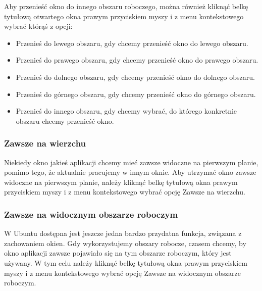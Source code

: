 Aby przenieść okno do innego obszaru roboczego, można również kliknąć belkę tytułową otwartego okna prawym przyciskiem myszy i z menu kontekstowego wybrać którąś z opcji:
\begin{itemize}
\item \textcolor{ubuntu_orange}{Przenieś do lewego obszaru}, gdy chcemy przenieść okno do lewego obszaru.
\item \textcolor{ubuntu_orange}{Przenieś do prawego obszaru}, gdy chcemy przenieść okno do prawego obszaru.
\item \textcolor{ubuntu_orange}{Przenieś do dolnego obszaru}, gdy chcemy przenieść okno do dolnego obszaru.
\item \textcolor{ubuntu_orange}{Przenieś do górnego obszaru}, gdy chcemy przenieść okno do górnego obszaru.
\item \textcolor{ubuntu_orange}{Przenieś do innego obszaru}, gdy chcemy wybrać, do którego konkretnie obszaru chcemy przenieść okno.
\end{itemize}

\subsubsection{Zawsze na wierzchu}
Niekiedy okno jakieś aplikacji chcemy mieć zawsze widoczne na pierwszym planie, pomimo tego, że aktualnie pracujemy w innym oknie. Aby utrzymać okno zawsze widoczne na pierwszym planie, należy kliknąć belkę tytułową okna prawym przyciskiem myszy i z menu kontekstowego wybrać opcję \textcolor{ubuntu_orange}{Zawsze na wierzchu}.

\subsubsection{Zawsze na widocznym obszarze roboczym}
W Ubuntu dostępna jest jeszcze jedna bardzo przydatna funkcja, związana z zachowaniem okien. Gdy wykorzystujemy obszary robocze, czasem chcemy, by okno aplikacji zawsze pojawiało się na tym obszarze roboczym, który jest używany. W tym celu należy kliknąć belkę tytułową okna prawym przyciskiem myszy i z menu kontekstowego wybrać opcję \textcolor{ubuntu_orange}{Zawsze na widocznym obszarze roboczym}.
